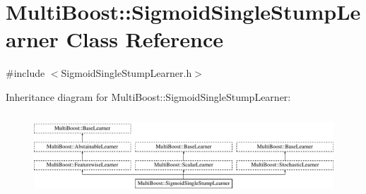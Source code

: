 \hypertarget{classMultiBoost_1_1SigmoidSingleStumpLearner}{
\section{MultiBoost::SigmoidSingleStumpLearner Class Reference}
\label{classMultiBoost_1_1SigmoidSingleStumpLearner}
}


{\ttfamily \#include $<$SigmoidSingleStumpLearner.h$>$}

Inheritance diagram for MultiBoost::SigmoidSingleStumpLearner:\begin{figure}[H]
\begin{center}
\leavevmode
\includegraphics[height=3.085399cm]{classMultiBoost_1_1SigmoidSingleStumpLearner}
\end{center}
\end{figure}
